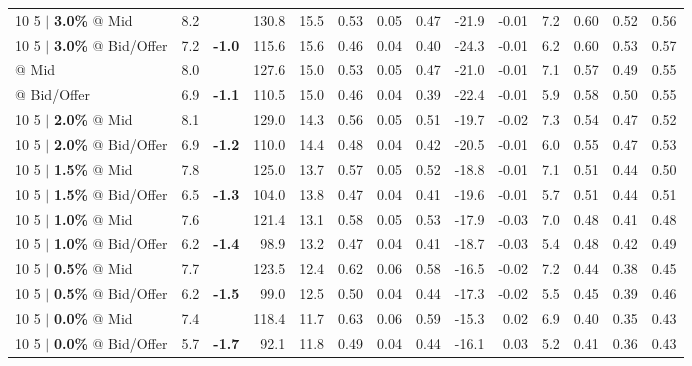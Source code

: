 \documentclass{beamer}
\begin{document}
\begin{frame}
\begin{table}
{\begin{tabular}{lrcrrrrrrrrrrr}
\addlinespace
{10 5 $|$ \bf 3.0\%} @ Mid & 8.2 & & 130.8 & 15.5 & 0.53 & 0.05 & 0.47 & -21.9 & -0.01 & 7.2 & 0.60 & 0.52 & 0.56\\
{10 5 $|$ \bf 3.0\%} @ Bid/Offer & 7.2 & {\bf \color{red}-1.0} & 115.6 & 15.6 & 0.46 & 0.04 & 0.40 & -24.3 & -0.01 & 6.2 & 0.60 & 0.53 & 0.57\\
\addlinespace
\color{blue}{10 5 $|$ \bf 2.5\%} @ Mid & 8.0 & & 127.6 & 15.0 & 0.53 & 0.05 & 0.47 & -21.0 & -0.01 & 7.1 & 0.57 & 0.49 & 0.55\\
\color{blue}{10 5 $|$ \bf 2.5\%} @ Bid/Offer & 6.9 & {\bf \color{red}-1.1} & 110.5 & 15.0 & 0.46 & 0.04 & 0.39 & -22.4 & -0.01 & 5.9 & 0.58 & 0.50 & 0.55\\
\addlinespace
{10 5 $|$ \bf 2.0\%} @ Mid & 8.1 & & 129.0 & 14.3 & 0.56 & 0.05 & 0.51 & -19.7 & -0.02 & 7.3 & 0.54 & 0.47 & 0.52\\
{10 5 $|$ \bf 2.0\%} @ Bid/Offer & 6.9 & {\bf \color{red}-1.2} & 110.0 & 14.4 & 0.48 & 0.04 & 0.42 & -20.5 & -0.01 & 6.0 & 0.55 & 0.47 & 0.53\\
\addlinespace
{10 5 $|$ \bf 1.5\%} @ Mid & 7.8 & & 125.0 & 13.7 & 0.57 & 0.05 & 0.52 & -18.8 & -0.01 & 7.1 & 0.51 & 0.44 & 0.50\\
{10 5 $|$ \bf 1.5\%} @ Bid/Offer & 6.5 & {\bf \color{red}-1.3} & 104.0 & 13.8 & 0.47 & 0.04 & 0.41 & -19.6 & -0.01 & 5.7 & 0.51 & 0.44 & 0.51\\
\addlinespace
{10 5 $|$ \bf 1.0\%} @ Mid & 7.6 & & 121.4 & 13.1 & 0.58 & 0.05 & 0.53 & -17.9 & -0.03 & 7.0 & 0.48 & 0.41 & 0.48\\
{10 5 $|$ \bf 1.0\%} @ Bid/Offer & 6.2 & {\bf \color{red}-1.4} & 98.9 & 13.2 & 0.47 & 0.04 & 0.41 & -18.7 & -0.03 & 5.4 & 0.48 & 0.42 & 0.49\\
\addlinespace
{10 5 $|$ \bf 0.5\%} @ Mid & 7.7 & & 123.5 & 12.4 & 0.62 & 0.06 & 0.58 & -16.5 & -0.02 & 7.2 & 0.44 & 0.38 & 0.45\\
{10 5 $|$ \bf 0.5\%} @ Bid/Offer & 6.2 & {\bf \color{red}-1.5} & 99.0 & 12.5 & 0.50 & 0.04 & 0.44 & -17.3 & -0.02 & 5.5 & 0.45 & 0.39 & 0.46\\
\addlinespace
{10 5 $|$ \bf 0.0\%} @ Mid & 7.4 & & 118.4 & 11.7 & 0.63 & 0.06 & 0.59 & -15.3 & 0.02 & 6.9 & 0.40 & 0.35 & 0.43\\
{10 5 $|$ \bf 0.0\%} @ Bid/Offer & 5.7 & {\bf \color{red}-1.7} & 92.1 & 11.8 & 0.49 & 0.04 & 0.44 & -16.1 & 0.03 & 5.2 & 0.41 & 0.36 & 0.43\\
\bottomrule
\end{tabular}
}
\end{table}
\end{frame}
\end{document}
